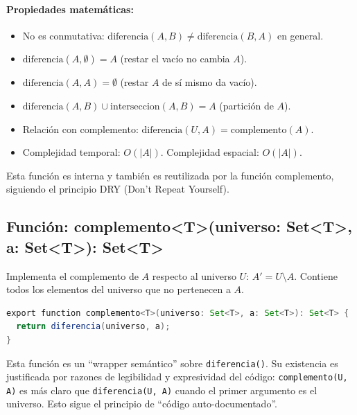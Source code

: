 \documentclass[11pt,a4paper]{article}
\begin{document}
\paragraph{Propiedades matemáticas:}
\begin{itemize}[noitemsep]
    \item No es conmutativa: $\text{diferencia}(A,B) \neq \text{diferencia}(B,A)$ en general.
    \item $\text{diferencia}(A,\emptyset) = A$ (restar el vacío no cambia $A$).
    \item $\text{diferencia}(A,A) = \emptyset$ (restar $A$ de sí mismo da vacío).
    \item $\text{diferencia}(A,B) \cup \text{interseccion}(A,B) = A$ (partición de $A$).
    \item Relación con complemento: $\text{diferencia}(U,A) = \text{complemento}(A)$.
    \item Complejidad temporal: $O(|A|)$. Complejidad espacial: $O(|A|)$.
\end{itemize}
Esta función es interna y también es reutilizada por la función complemento, siguiendo el principio DRY (Don't Repeat Yourself).

\subsection{Función: complemento\textless{}T\textgreater{}(universo: Set\textless{}T\textgreater{}, a: Set\textless{}T\textgreater{}): Set\textless{}T\textgreater{}}
Implementa el complemento de $A$ respecto al universo $U$: $A' = U \setminus A$. Contiene todos los elementos del universo que no pertenecen a $A$.

\begin{lstlisting}[language=Java, caption={operations.ts - función complemento}]
export function complemento<T>(universo: Set<T>, a: Set<T>): Set<T> {
  return diferencia(universo, a);
}
\end{lstlisting}

Esta función es un ``wrapper semántico'' sobre \texttt{diferencia()}. Su existencia es justificada por razones de legibilidad y expresividad del código: \texttt{complemento(U, A)} es más claro que \texttt{diferencia(U, A)} cuando el primer argumento es el universo. Esto sigue el principio de ``código auto-documentado''.
\end{document}

